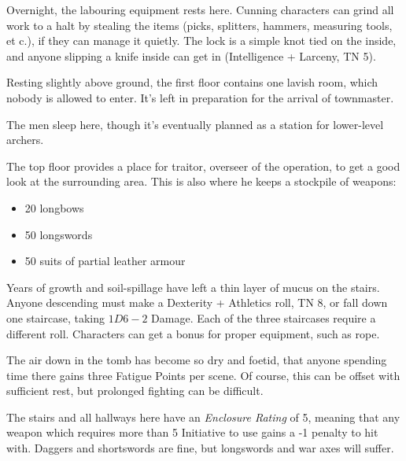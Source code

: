 \begin{multicols}{2}

Overnight, the labouring equipment rests here.  Cunning characters can grind all work to a halt by stealing the items (picks, splitters, hammers, measuring tools, et c.), if they can manage it quietly.  The lock is a simple knot tied on the inside, and anyone slipping a knife inside can get in (Intelligence + Larceny, TN 5).


Resting slightly above ground, the first floor contains one lavish room, which nobody is allowed to enter.  It's left in preparation for the arrival of \gls{townmaster}.


The men sleep here, though it's eventually planned as a station for lower-level archers.


The top floor provides a place for \gls{traitor}, overseer of the operation, to get a good look at the surrounding area.
This is also where he keeps a stockpile of weapons:

\begin{itemize}

  \item{20 longbows}
  \item{50 longswords}
  \item{50 suits of partial leather armour}

\end{itemize}

\label{underGreenTower}

Years of growth and soil-spillage have left a thin layer of mucus on the stairs.
Anyone descending must make a Dexterity + Athletics roll, TN 8, or fall down one staircase, taking $1D6-2$ Damage.
Each of the three staircases require a different roll.
Characters can get a bonus for proper equipment, such as rope.

The air down in the tomb has become so dry and foetid, that anyone spending time there gains three Fatigue Points per scene.
Of course, this can be offset with sufficient rest, but prolonged fighting can be difficult.

The stairs and all hallways here have an \textit{Enclosure Rating} of 5, meaning that any weapon which requires more than 5 Initiative to use gains a -1 penalty to hit with.
Daggers and shortswords are fine, but longswords and war axes will suffer.


\end{multicols}
